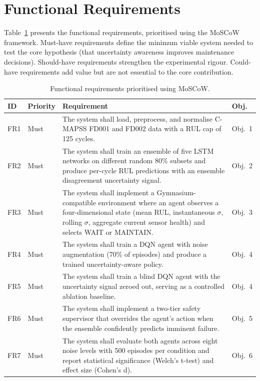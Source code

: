 \documentclass[12pt,a4paper]{report}
\begin{document}
\section{Functional Requirements}

Table~\ref{tab:func_req} presents the functional requirements, prioritised using the MoSCoW framework. Must-have requirements define the minimum viable system needed to test the core hypothesis (that uncertainty awareness improves maintenance decisions). Should-have requirements strengthen the experimental rigour. Could-have requirements add value but are not essential to the core contribution.


\begin{table}[h]
\centering
\small
\caption{Functional requirements prioritised using MoSCoW.}
\label{tab:func_req}
\renewcommand{\arraystretch}{1.3}
\setlength{\tabcolsep}{4pt}
\begin{tabularx}{\textwidth}{@{}>{\raggedright\arraybackslash}p{1.0cm} >{\raggedright\arraybackslash}p{1.55cm} >{\raggedright\arraybackslash}X >{\raggedright\arraybackslash}p{1.55cm}@{}}
\toprule
\textbf{ID} & \textbf{Priority} & \textbf{Requirement} & \textbf{Obj.} \\
\midrule
FR1 & Must & The system shall load, preprocess, and normalise C-MAPSS FD001 and FD002 data with a RUL cap of 125 cycles. & Obj.~1 \\
FR2 & Must & The system shall train an ensemble of five LSTM networks on different random 80\% subsets and produce per-cycle RUL predictions with an ensemble disagreement uncertainty signal. & Obj.~2 \\
FR3 & Must & The system shall implement a Gymnasium-compatible environment where an agent observes a four-dimensional state (mean RUL, instantaneous $\sigma$, rolling $\sigma$, aggregate current sensor health) and selects WAIT or MAINTAIN. & Obj.~3 \\
FR4 & Must & The system shall train a DQN agent with noise augmentation (70\% of episodes) and produce a trained uncertainty-aware policy. & Obj.~4 \\
FR5 & Must & The system shall train a blind DQN agent with the uncertainty signal zeroed out, serving as a controlled ablation baseline. & Obj.~4 \\
FR6 & Must & The system shall implement a two-tier safety supervisor that overrides the agent's action when the ensemble confidently predicts imminent failure. & Obj.~5 \\
FR7 & Must & The system shall evaluate both agents across eight noise levels with 500 episodes per condition and report statistical significance (Welch's t-test) and effect size (Cohen's d). & Obj.~6 \\

\end{tabularx}
\end{table}
\end{document}
